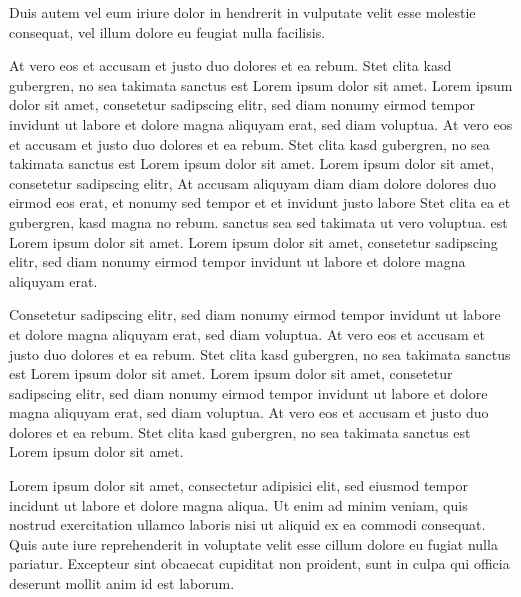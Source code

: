 \documentclass[twoside,a4paper]{article}
\begin{document}
Duis autem vel eum iriure dolor in hendrerit in vulputate velit esse molestie consequat, vel illum dolore eu feugiat nulla facilisis.

At vero eos et accusam et justo duo dolores et ea rebum. Stet clita kasd gubergren, no sea takimata sanctus est Lorem ipsum dolor sit amet. Lorem ipsum dolor sit amet, consetetur sadipscing elitr, sed diam nonumy eirmod tempor invidunt ut labore et dolore magna aliquyam erat, sed diam voluptua. At vero eos et accusam et justo duo dolores et ea rebum. Stet clita kasd gubergren, no sea takimata sanctus est Lorem ipsum dolor sit amet. Lorem ipsum dolor sit amet, consetetur sadipscing elitr, At accusam aliquyam diam diam dolore dolores duo eirmod eos erat, et nonumy sed tempor et et invidunt justo labore Stet clita ea et gubergren, kasd magna no rebum. sanctus sea sed takimata ut vero voluptua. est Lorem ipsum dolor sit amet. Lorem ipsum dolor sit amet, consetetur sadipscing elitr, sed diam nonumy eirmod tempor invidunt ut labore et dolore magna aliquyam erat.

Consetetur sadipscing elitr, sed diam nonumy eirmod tempor invidunt ut labore et dolore magna aliquyam erat, sed diam voluptua. At vero eos et accusam et justo duo dolores et ea rebum. Stet clita kasd gubergren, no sea takimata sanctus est Lorem ipsum dolor sit amet. Lorem ipsum dolor sit amet, consetetur sadipscing elitr, sed diam nonumy eirmod tempor invidunt ut labore et dolore magna aliquyam erat, sed diam voluptua. At vero eos et accusam et justo duo dolores et ea rebum. Stet clita kasd gubergren, no sea takimata sanctus est Lorem ipsum dolor sit amet. 

Lorem ipsum dolor sit amet, consectetur adipisici elit, sed eiusmod tempor incidunt ut labore et dolore magna aliqua. Ut enim ad minim veniam, quis nostrud exercitation ullamco laboris nisi ut aliquid ex ea commodi consequat. Quis aute iure reprehenderit in voluptate velit esse cillum dolore eu fugiat nulla pariatur. Excepteur sint obcaecat cupiditat non proident, sunt in culpa qui officia deserunt mollit anim id est laborum.


\end{document}

